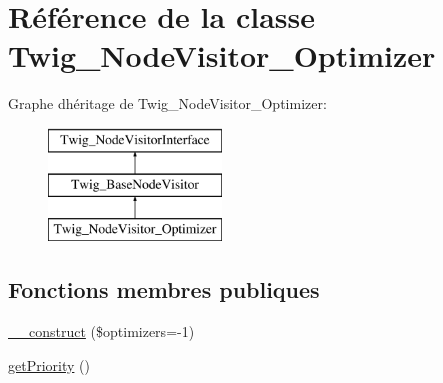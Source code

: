 \hypertarget{class_twig___node_visitor___optimizer}{}\section{Référence de la classe Twig\+\_\+\+Node\+Visitor\+\_\+\+Optimizer}
\label{class_twig___node_visitor___optimizer}
Graphe d\textquotesingle{}héritage de Twig\+\_\+\+Node\+Visitor\+\_\+\+Optimizer\+:\begin{figure}[H]
\begin{center}
\leavevmode
\includegraphics[height=3.000000cm]{class_twig___node_visitor___optimizer}
\end{center}
\end{figure}
\subsection*{Fonctions membres publiques}
\begin{DoxyCompactItemize}
\item 
\hyperlink{class_twig___node_visitor___optimizer_a39e1de056975cf1aea3660cbd2c0ebc9}{\+\_\+\+\_\+construct} (\$optimizers=-\/1)
\item 
\hyperlink{class_twig___node_visitor___optimizer_a1e7a3c168dcd0901a0d2669c67575b55}{get\+Priority} ()
\end{DoxyCompactItemize}
